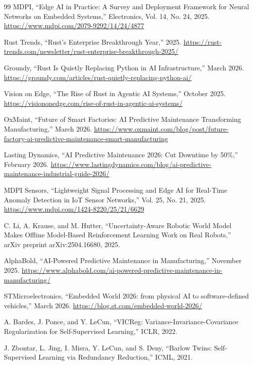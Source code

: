\documentclass[11pt,a4paper]{ltjsarticle}
\begin{document}
\begin{thebibliography}{99}
MDPI,
``Edge AI in Practice: A Survey and Deployment Framework for Neural Networks on Embedded Systems,''
Electronics, Vol. 14, No. 24, 2025.
\url{https://www.mdpi.com/2079-9292/14/24/4877}

Rust Trends,
``Rust's Enterprise Breakthrough Year,''
2025.
\url{https://rust-trends.com/newsletter/rust-enterprise-breakthrough-2025/}

Groundy,
``Rust Is Quietly Replacing Python in AI Infrastructure,''
March 2026.
\url{https://groundy.com/articles/rust-quietly-replacing-python-ai/}

Vision on Edge,
``The Rise of Rust in Agentic AI Systems,''
October 2025.
\url{https://visiononedge.com/rise-of-rust-in-agentic-ai-systems/}

OxMaint,
``Future of Smart Factories: AI Predictive Maintenance Transforming Manufacturing,''
March 2026.
\url{https://www.oxmaint.com/blog/post/future-factory-ai-predictive-maintenance-smart-manufacturing}

Lasting Dynamics,
``AI Predictive Maintenance 2026: Cut Downtime by 50\%,''
February 2026.
\url{https://www.lastingdynamics.com/blog/ai-predictive-maintenance-industrial-guide-2026/}

MDPI Sensors,
``Lightweight Signal Processing and Edge AI for Real-Time Anomaly Detection in IoT Sensor Networks,''
Vol. 25, No. 21, 2025.
\url{https://www.mdpi.com/1424-8220/25/21/6629}

C. Li, A. Krause, and M. Hutter,
``Uncertainty-Aware Robotic World Model Makes Offline Model-Based Reinforcement Learning Work on Real Robots,''
arXiv preprint arXiv:2504.16680, 2025.


AlphaBold,
``AI-Powered Predictive Maintenance in Manufacturing,''
November 2025.
\url{https://www.alphabold.com/ai-powered-predictive-maintenance-in-manufacturing/}

STMicroelectronics,
``Embedded World 2026: from physical AI to software-defined vehicles,''
March 2026.
\url{https://blog.st.com/embedded-world-2026/}

A. Bardes, J. Ponce, and Y. LeCun,
``VICReg: Variance-Invariance-Covariance Regularization for Self-Supervised Learning,''
ICLR, 2022.

J. Zbontar, L. Jing, I. Misra, Y. LeCun, and S. Deny,
``Barlow Twins: Self-Supervised Learning via Redundancy Reduction,''
ICML, 2021.


\end{thebibliography}
\end{document}
